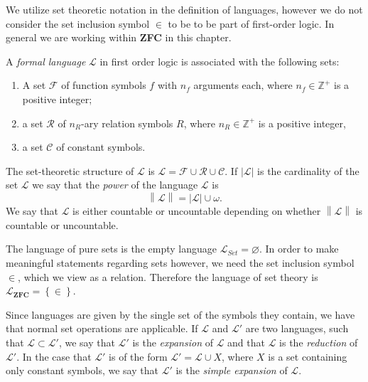\documentclass[../../main.tex]{subfiles}
\begin{document}
We utilize set theoretic notation in the definition of languages, however we do not consider the set inclusion symbol $\in$ to be to be part of first-order logic.
In general we are working within \textbf{ZFC} in this chapter.

\begin{definition}
    A \textit{formal language} $\mathcal{L}$ in first order logic is associated with the following sets:
    \begin{enumerate}
        \item A set $\mathcal{F}$ of function symbols $f$ with $n_f$ arguments each, 
        where $n_f \in \mathbb{Z}^+$ is a positive integer;
        \item a set $\mathcal{R}$ of $n_R$-ary relation symbols $R$, 
        where $n_R \in \mathbb{Z}^+$ is a positive integer,
        \item a set $\mathcal{C}$ of constant symbols. \cite[Definition 1.1.1]{Mar02}
    \end{enumerate}
    The set-theoretic structure of $\mathcal{L}$ is $\mathcal{L} = \mathcal{F} \cup \mathcal{R} \cup \mathcal{C}$.
    If $\left\lvert \mathcal{L}\right\rvert$ is the cardinality of the set $\mathcal{L}$ we say that the \textit{power} of the language $\mathcal{L}$ is
    $$\left\lVert \mathcal{L}\right\rVert = \left\lvert\mathcal{L}\right\rvert \cup \omega.$$
    We say that $\mathcal{L}$ is either countable or uncountable depending on whether $\left\lVert\mathcal{L}\right\rVert$ is countable or uncountable. \cite[\S1.3]{Cha90}
\end{definition}

The language of pure sets is the empty language $\mathcal{L}_{Set} = \varnothing$.
In order to make meaningful statements regarding sets however, we need the set inclusion symbol $\in$, which we view as a relation.
Therefore the language of set theory is $\mathcal{L}_{\textbf{ZFC}} = \left\{\in\right\}$. \cite[p.8]{Mar02}\cite[p.80]{Jec78}

Since languages are given by the single set of the symbols they contain, we have that normal set operations are applicable.
If $\mathcal{L}$ and $\mathcal{L}'$ are two languages, such that $\mathcal{L} \subset \mathcal{L}'$, 
we say that $\mathcal{L}'$ is the \textit{expansion} of $\mathcal{L}$ and that $\mathcal{L}$ is the \textit{reduction} of $\mathcal{L}'$.
In the case that $\mathcal{L}'$ is of the form $\mathcal{L}'= \mathcal{L} \cup X$, where $X$ is a set containing only constant symbols, 
we say that $\mathcal{L}'$ is the \textit{simple expansion} of $\mathcal{L}$. \cite[p.19]{Cha90}
\end{document}
